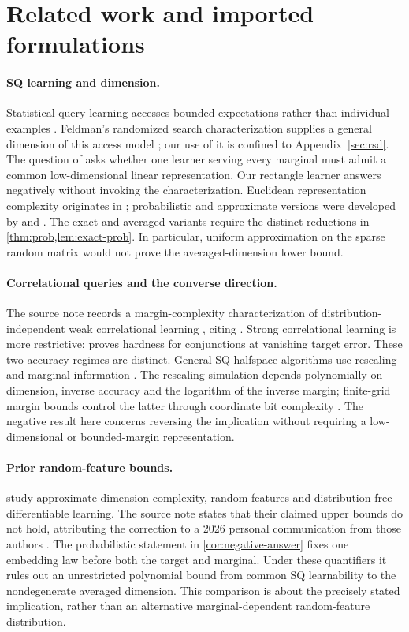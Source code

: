 \section{Related work and imported formulations}\label{sec:related}
\paragraph{SQ learning and dimension.}
Statistical-query learning accesses bounded expectations rather than individual examples \citep{Kearns98}. Feldman's randomized search characterization supplies a general dimension of this access model \citep{Feldman17}; our use of it is confined to Appendix~\ref{sec:rsd}. The question of \citet{FKS26} asks whether one learner serving every marginal must admit a common low-dimensional linear representation. Our rectangle learner answers negatively without invoking the characterization. Euclidean representation complexity originates in \citet{BDES02}; probabilistic and approximate versions were developed by \citet{CMW25} and \citet{KMS20}. The exact and averaged variants require the distinct reductions in \cref{thm:prob,lem:exact-prob}. In particular, uniform approximation on the sparse random matrix would not prove the averaged-dimension lower bound.

\paragraph{Correlational queries and the converse direction.}
The source note records a margin-complexity characterization of distribution-independent weak correlational learning \citep[Section~3]{FKS26}, citing \citet{Feldman08}. Strong correlational learning is more restrictive: \citet{Feldman11} proves hardness for conjunctions at vanishing target error. These two accuracy regimes are distinct. General SQ halfspace algorithms use rescaling and marginal information \citep{DV04,BF13}. The rescaling simulation depends polynomially on dimension, inverse accuracy and the logarithm of the inverse margin; finite-grid margin bounds control the latter through coordinate bit complexity \citep{GSS13}. The negative result here concerns reversing the implication without requiring a low-dimensional or bounded-margin representation.

\paragraph{Prior random-feature bounds.}
\citet{KM25} study approximate dimension complexity, random features and distribution-free differentiable learning. The source note states that their claimed upper bounds do not hold, attributing the correction to a 2026 personal communication from those authors \citep[Section~3]{FKS26}. The probabilistic statement in \cref{cor:negative-answer} fixes one embedding law before both the target and marginal. Under these quantifiers it rules out an unrestricted polynomial bound from common SQ learnability to the nondegenerate averaged dimension. This comparison is about the precisely stated implication, rather than an alternative marginal-dependent random-feature distribution.

